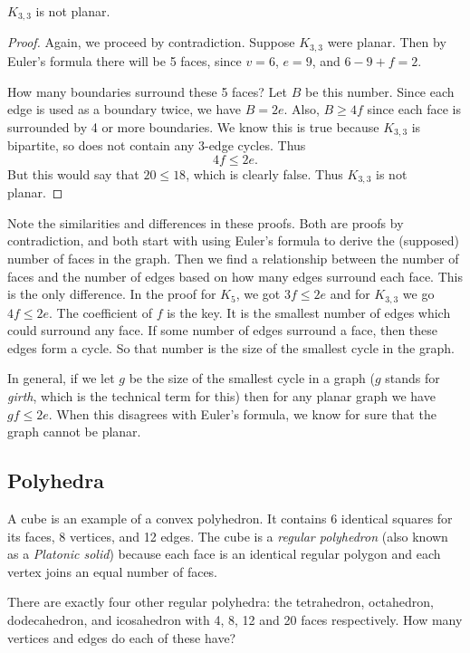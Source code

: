 \documentclass[12pt]{article}
\begin{document}
\begin{theorem}
  $K_{3,3}$ is not planar.
\end{theorem}

\begin{proof}
  Again, we proceed by contradiction.  Suppose $K_{3,3}$ were planar.  Then by Euler's formula there will be 5 faces, since $v = 6$, $e = 9$, and $6 - 9 + f = 2$.
  
  How many boundaries surround these 5 faces?  Let $B$ be this number.  Since each edge is used as a boundary twice, we have $B = 2e$.  Also, $B \ge 4f$ since each face is surrounded by 4 or more boundaries.  We know this is true because $K_{3,3}$ is bipartite, so does not contain any 3-edge cycles.  Thus
  \[4f \le 2e.\]
  But this would say that $20 \le 18$, which is clearly false.  Thus $K_{3,3}$ is not planar.
\end{proof}

Note the similarities and differences in these proofs.  Both are proofs by contradiction, and both start with using Euler's formula to derive the (supposed) number of faces in the graph.  Then we find a relationship between the number of faces and the number of edges based on how many edges surround each face.  This is the only difference.  In the proof for $K_5$, we got $3f \le 2e$ and for $K_{3,3}$ we go $4f \le 2e$.  The coefficient of $f$ is the key.  It is the smallest number of edges which could surround any face.  If some number of edges surround a face, then these edges form a cycle.  So that number is the size of the smallest cycle in the graph.

In general, if we let $g$ be the size of the smallest cycle in a graph ($g$ stands for {\em girth}, which is the technical term for this) then for any planar graph we have $gf \le 2e$.  When this disagrees with Euler's formula, we know for sure that the graph cannot be planar.

\subsection{Polyhedra}
\begin{activity}
A cube is an example of a convex polyhedron.  It contains 6 identical squares for its faces, 8 vertices, and 12 edges.  The cube is a \emph{regular polyhedron} (also known as a \emph{Platonic solid}) because each face is an identical regular polygon and each vertex joins an equal number of faces.

There are exactly four other regular polyhedra: the tetrahedron, octahedron, dodecahedron, and icosahedron with 4, 8, 12 and 20 faces respectively.  How many vertices and edges do each of these have?
\end{activity}
\end{document}
